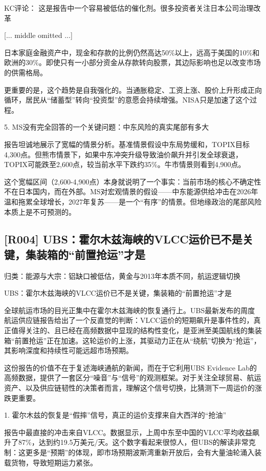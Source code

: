 \documentclass[11pt]{ctexart}
\begin{document}
KC评论： 这是报告中一个容易被低估的催化剂。很多投资者关注日本公司治理改革

[... middle omitted ...]

日本家庭金融资产中，现金和存款的比例仍然高达50\%以上，远高于美国的10\%和欧洲的30\%。即使只有一小部分资金从存款转向股票，其边际影响也足以改变市场的供需格局。

更重要的是，这个趋势是自我强化的。当通胀稳定、工资上涨、股价上升形成正向循环，居民从“储蓄型”转向“投资型”的意愿会持续增强。NISA只是加速了这个过程。

5. MS没有完全回答的一个关键问题：中东风险的真实尾部有多大

报告坦诚地展示了宽幅的情景分析。基准情景假设中东局势缓和，TOPIX目标4,300点。但熊市情景下，如果中东冲突升级导致油价飙升并引发全球衰退，TOPIX可能跌至2,600点，较当前水平下跌约35\%。牛市情景则看到4,900点。

这个宽幅区间（2,600-4,900点）本身就说明了一个事实：当前市场的核心不确定性不在日本国内，而在外部。MS对宏观情景的假设——中东能源供给冲击在2026年温和拖累全球增长，2027年复苏——是一个“有序”的情景。但地缘政治的尾部风险本质上是不可预测的。

\subsection{[R004] UBS：霍尔木兹海峡的VLCC运价已不是关键，集装箱的“前置抢运”才是}
{\small\color{refgray}归类：能源与大宗：铝缺口被低估，黄金与2013年本质不同，航运逻辑切换}

UBS：霍尔木兹海峡的VLCC运价已不是关键，集装箱的“前置抢运”才是

全球航运市场的目光正集中在霍尔木兹海峡的恢复通行上。UBS最新发布的周度航运供应链报告给出了一个反直觉的判断：VLCC运价的短期飙升是事件性的，真正值得关注的、且已经在高频数据中显现的结构性变化，是亚洲至美国航线的集装箱“前置抢运”正在加速。这轮运价的上涨，其驱动力正在从“绕航”切换为“抢运”，其影响深度和持续性可能远超市场预期。

这份报告的价值不在于复述海峡通航的新闻，而在于它利用UBS Evidence Lab的高频数据，提供了一套区分“噪音”与“信号”的观测框架。对于关注全球贸易、航运资产、以及供应链韧性的决策者而言，理解这个信号切换，比猜测下一周运价的涨跌更重要。

1. 霍尔木兹的恢复是“假摔”信号，真正的运价支撑来自大西洋的“抢油”

报告中最直接的冲击来自VLCC。数据显示，上周中东至中国的VLCC平均收益飙升了87\%，达到约19.5万美元/天。这个数字看起来很惊人，但UBS的解读非常克制：这更多是“预期”的体现，即市场预期波斯湾重新开放后，会有大量油轮涌入装载货物，导致短期运力紧张。
\end{document}
